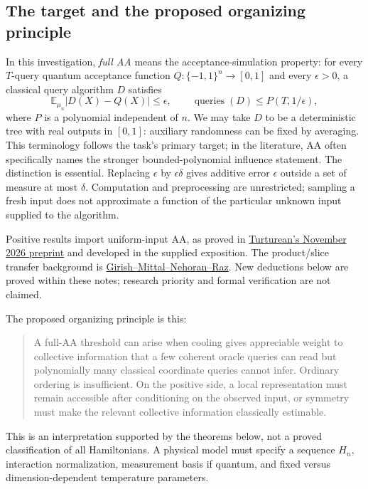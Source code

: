 \subsection{The target and the proposed organizing principle}
\label{tht:target}

In this investigation, \emph{full AA} means the acceptance-simulation
property: for every $T$-query quantum acceptance function
$Q:\{-1,1\}^n\to[0,1]$ and every $\epsilon>0$, a classical query
algorithm $D$ satisfies
\[
 \mathbb E_{\mu_n}|D(X)-Q(X)|\le\epsilon,
 \qquad \operatorname{queries}(D)\le P(T,1/\epsilon),
\]
where $P$ is a polynomial independent of $n$. We may take $D$ to be a
deterministic tree with real outputs in $[0,1]$: auxiliary randomness
can be fixed by averaging. This terminology follows the task's primary
target; in the literature, AA often specifically names the stronger
bounded-polynomial influence statement. The distinction is essential.
Replacing $\epsilon$ by $\epsilon\delta$ gives additive error $\epsilon$
outside a set of measure at most $\delta$. Computation and preprocessing
are unrestricted; sampling a fresh input does not approximate a function
of the particular unknown input supplied to the algorithm.

Positive results import uniform-input AA, as proved in
\href{https://arxiv.org/abs/2611.09773}{Turturean's November 2026 preprint}
and developed in the supplied exposition. The product/slice transfer
background is
\href{https://arxiv.org/abs/2609.35327}{Girish--Mittal--Nehoran--Raz}.
New deductions below are proved within these notes; research priority
and formal verification are not claimed.

The proposed organizing principle is this:
\begin{quote}
A full-AA threshold can arise when cooling gives appreciable weight to
collective information that a few coherent oracle queries can read but
polynomially many classical coordinate queries cannot infer. Ordinary
ordering is insufficient. On the positive side, a local representation
must remain accessible after conditioning on the observed input, or
symmetry must make the relevant collective information classically
estimable.
\end{quote}
This is an interpretation supported by the theorems below, not a proved
classification of all Hamiltonians. A physical model must specify a
sequence $H_n$, interaction normalization, measurement basis if quantum,
and fixed versus dimension-dependent temperature parameters.

